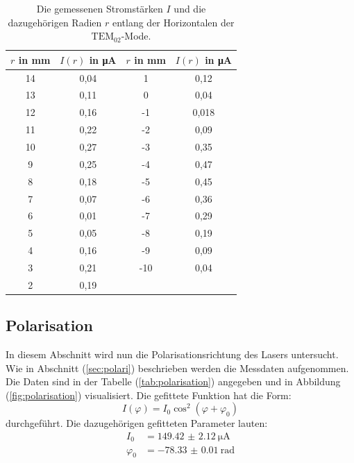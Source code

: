 \begin{table}
 \centering
 \caption{Die gemessenen Stromstärken $I$ und die dazugehörigen Radien $r$ entlang der Horizontalen der $\mathrm{TEM}_\mathrm{02}$-Mode.}
 \label{tab:T02}
 \begin{tabular}{c c c c}
   \toprule
   $r$ in mm & $I(r)$ in \si{\micro\ampere} & $r$ in mm & $I(r)$ in \si{\micro\ampere} \\
   \midrule
   14  & 0,04 & 1   & 0,12 \\
   13  & 0,11 & 0   & 0,04 \\
   12  & 0,16 & -1  & 0,018 \\
   11  & 0,22 & -2  & 0,09 \\
   10  & 0,27 & -3  & 0,35 \\
   9   & 0,25 & -4  & 0,47 \\
   8   & 0,18 & -5  & 0,45 \\
   7   & 0,07 & -6  & 0,36 \\
   6   & 0,01 & -7  & 0,29 \\
   5   & 0,05 & -8  & 0,19 \\
   4   & 0,16 & -9  & 0,09 \\
   3   & 0,21 & -10 & 0,04 \\
   2   & 0,19 & & \\
   \bottomrule
 \end{tabular}
\end{table}
\FloatBarrier
\subsection{Polarisation}
\label{sec:pol}

In diesem Abschnitt wird nun die Polarisationsrichtung des Lasers untersucht. Wie in Abschnitt (\ref{sec:polari}) beschrieben werden die Messdaten aufgenommen.
Die Daten sind in der Tabelle (\ref{tab:polarisation}) angegeben und in Abbildung (\ref{fig:polarisation}) visualisiert.
Die gefittete Funktion hat die Form:
\begin{equation}
  I(\varphi) = I_0 \cos^2\left(\varphi+\varphi_0\right)
\end{equation}
durchgeführt.
Die dazugehörigen gefitteten Parameter lauten:
\begin{align*}
I_0 &= \SI{149.42(212)}{\micro\ampere}\\
\varphi_0 &= \SI{-78.33(1)}{\radian}\\
\end{align*}

